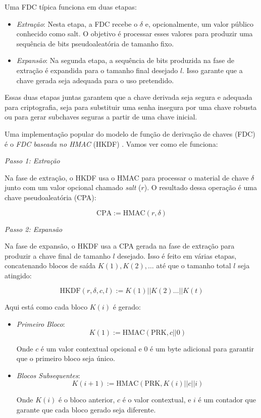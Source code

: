 Uma FDC típica funciona em duas etapas:
\begin{itemize}
\item[] {\em Extração}:
  Nesta etapa, a FDC recebe o $\delta$ e, opcionalmente, um valor público conhecido como salt.
  O objetivo é processar esses valores para produzir uma sequência de bits pseudoaleatória de tamanho fixo.
\item[] {\em Expansão}:
  Na segunda etapa, a sequência de bits produzida na fase de extração é expandida para o tamanho final desejado $l$.
  Isso garante que a chave gerada seja adequada para o uso pretendido.
\end{itemize}

Essas duas etapas juntas garantem que a chave derivada seja segura e adequada para criptografia, seja para substituir uma senha insegura por uma chave robusta ou para gerar subchaves seguras a partir de uma chave inicial.

Uma implementação popular do modelo de função de derivação de chaves (FDC) é o {\em FDC baseada no HMAC} (HKDF) \cite{Krawczyk10}.
Vamos ver como ele funciona:

{\em Passo 1: Extração}

Na fase de extração, o HKDF usa o HMAC para processar o material de chave $\delta$ junto com um valor opcional chamado {\em salt} ($r$).
O resultado dessa operação é uma chave pseudoaleatória (CPA):

\begin{displaymath}
\text{CPA} := \text{HMAC}(r, \delta)
\end{displaymath}

{\em Passo 2: Expansão}

Na fase de expansão, o HKDF usa a CPA gerada na fase de extração para produzir a chave final de tamanho $l$ desejado.
Isso é feito em várias etapas, concatenando blocos de saída $K(1), K(2), \dots$ até que o tamanho total $l$ seja atingido:

\begin{displaymath}
\text{HKDF}(r, \delta, c, l) := K(1) || K(2) \dots || K(t)
\end{displaymath}

Aqui está como cada bloco $K(i)$ é gerado:

\begin{itemize}
    \item {\em Primeiro Bloco}:
    \begin{displaymath}
      K(1) := \text{HMAC}(\text{PRK}, c || 0)
    \end{displaymath}

    Onde $c$ é um valor contextual opcional e 0 é um byte adicional para garantir que o primeiro bloco seja único.

    \item {\em Blocos Subsequentes}:
    \begin{displaymath}
    K(i + 1) := \text{HMAC}(\text{PRK}, K(i) || c || i)
    \end{displaymath}
    
    Onde $K(i)$ é o bloco anterior, $c$ é o valor contextual, e $i$ é um contador que garante que cada bloco gerado seja diferente.
\end{itemize}


